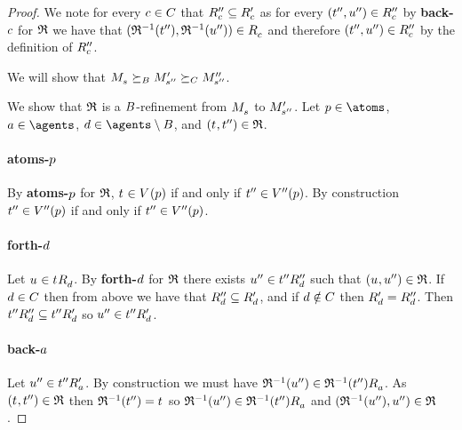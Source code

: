 \begin{proof}
We note for every $c \in C$ that ${R^{\prime\prime}_{c}} \subseteq {R^{\prime}_{c}}$ as for every $({t}^{\prime\prime}, {u}^{\prime\prime}) \in {R^{\prime\prime}_{c}}$ by {\bf back-$c$} for $\mathfrak{R}$ we have that $(\refinement^{-1}(\kStateTPP), \refinement^{-1}(\kStateUPP)) \in \kAccessibilityC$ and therefore $({t}^{\prime\prime}, {u}^{\prime\prime}) \in {R^{\prime\prime}_{c}}$ by the definition of ${R^{\prime\prime}_{c}}$.

We will show that $\kPModel{\kStateS} \simulatesBs \kPModelP{\kStateSPP} \simulatesCs \kPModelPP{\kStateSPP}$.

We show that $\mathfrak{R}$ is a $B$-refinement from $\kPModel{\kStateS}$ to ${M^{\prime}_{{s}^{\prime\prime}}}$.
Let $\atomP \in \atoms$, $\agentA \in \agents$, $\agentD \in \agents \setminus \agentsB$, and $(\kStateT, \kStateTPP) \in \refinement$.

\paragraph{atoms-$p$}
By {\bf atoms-$p$} for $\mathfrak{R}$, $\kStateT \in \kValuation(\atomP)$ if and only if ${t}^{\prime\prime} \in {V^{\prime\prime}}(p)$.
By construction ${t}^{\prime\prime} \in {V^{\prime\prime}}(p)$ if and only if ${t}^{\prime\prime} \in {V^{\prime\prime}}(p)$.

\paragraph{forth-$d$}
Let $\kStateU \in \kSuccessorsD{\kStateT}$.
By {\bf forth-$d$} for $\mathfrak{R}$ there exists ${u}^{\prime\prime} \in {{t}^{\prime\prime}} {R^{\prime\prime}_{d}}$ such that $(\kStateU, \kStateUPP) \in \refinement$.
If $d \in C$ then from above we have that ${R^{\prime\prime}_{d}} \subseteq {R^{\prime}_{d}}$, and if $d \notin C$ then ${R^{\prime}_{d}} = {R^{\prime\prime}_{d}}$.
Then ${{t}^{\prime\prime}} {R^{\prime\prime}_{d}} \subseteq {{t}^{\prime\prime}} {R^{\prime}_{d}}$ so ${u}^{\prime\prime} \in {{t}^{\prime\prime}} {R^{\prime}_{d}}$.

\paragraph{back-$a$}
Let ${u}^{\prime\prime} \in {{t}^{\prime\prime}} {R^{\prime}_{a}}$.
By construction we must have $\refinement^{-1}(\kStateUPP) \in \kSuccessorsA{\refinement^{-1}(\kStateTPP)}$.
As $(\kStateT, \kStateTPP) \in \refinement$ then $\refinement^{-1}(\kStateTPP) = \kStateT$ so $\refinement^{-1}(\kStateUPP) \in \kSuccessorsA{\refinement^{-1}(\kStateTPP)}$ and $(\mathfrak{R}^{-1}({u}^{\prime\prime}), {u}^{\prime\prime}) \in \mathfrak{R}$.


\end{proof}
